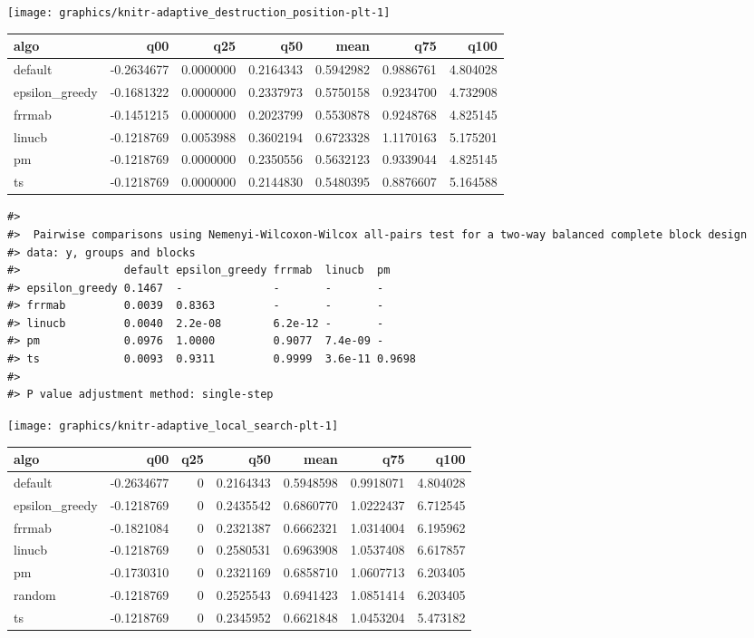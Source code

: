 \documentclass[
]{article}
\begin{document}
\begin{center}\texttt{[image: graphics/knitr-adaptive\_destruction\_position-plt-1]} \end{center}

\begin{longtable}[]{@{}lrrrrrr@{}}
\toprule
algo & q00 & q25 & q50 & mean & q75 & q100 \\
\midrule
\endhead
default & -0.2634677 & 0.0000000 & 0.2164343 & 0.5942982 & 0.9886761 &
4.804028 \\
epsilon\_greedy & -0.1681322 & 0.0000000 & 0.2337973 & 0.5750158 &
0.9234700 & 4.732908 \\
frrmab & -0.1451215 & 0.0000000 & 0.2023799 & 0.5530878 & 0.9248768 &
4.825145 \\
linucb & -0.1218769 & 0.0053988 & 0.3602194 & 0.6723328 & 1.1170163 &
5.175201 \\
pm & -0.1218769 & 0.0000000 & 0.2350556 & 0.5632123 & 0.9339044 &
4.825145 \\
ts & -0.1218769 & 0.0000000 & 0.2144830 & 0.5480395 & 0.8876607 &
5.164588 \\
\bottomrule
\end{longtable}

\begin{verbatim}
#> 
#>  Pairwise comparisons using Nemenyi-Wilcoxon-Wilcox all-pairs test for a two-way balanced complete block design
#> data: y, groups and blocks
#>                default epsilon_greedy frrmab  linucb  pm    
#> epsilon_greedy 0.1467  -              -       -       -     
#> frrmab         0.0039  0.8363         -       -       -     
#> linucb         0.0040  2.2e-08        6.2e-12 -       -     
#> pm             0.0976  1.0000         0.9077  7.4e-09 -     
#> ts             0.0093  0.9311         0.9999  3.6e-11 0.9698
#> 
#> P value adjustment method: single-step
\end{verbatim}

\begin{center}\texttt{[image: graphics/knitr-adaptive\_local\_search-plt-1]} \end{center}

\begin{longtable}[]{@{}lrrrrrr@{}}
\toprule
algo & q00 & q25 & q50 & mean & q75 & q100 \\
\midrule
\endhead
default & -0.2634677 & 0 & 0.2164343 & 0.5948598 & 0.9918071 &
4.804028 \\
epsilon\_greedy & -0.1218769 & 0 & 0.2435542 & 0.6860770 & 1.0222437 &
6.712545 \\
frrmab & -0.1821084 & 0 & 0.2321387 & 0.6662321 & 1.0314004 &
6.195962 \\
linucb & -0.1218769 & 0 & 0.2580531 & 0.6963908 & 1.0537408 &
6.617857 \\
pm & -0.1730310 & 0 & 0.2321169 & 0.6858710 & 1.0607713 & 6.203405 \\
random & -0.1218769 & 0 & 0.2525543 & 0.6941423 & 1.0851414 &
6.203405 \\
ts & -0.1218769 & 0 & 0.2345952 & 0.6621848 & 1.0453204 & 5.473182 \\
\bottomrule
\end{longtable}
\end{document}
